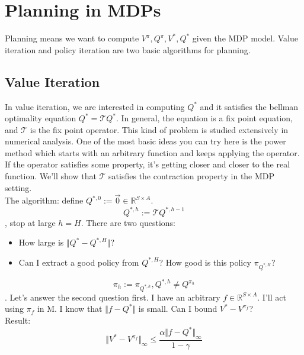 \documentclass{report}
\begin{document}
\section{Planning in MDPs}
Planning means we want to compute $V^{\pi}, Q^{\pi}, V^{*}, Q^{*}$ given the MDP model. Value iteration and policy iteration are two basic algorithms for planning.
\subsection{Value Iteration}
In value iteration, we are interested in computing $Q^*$ and it satisfies the bellman optimality equation $Q^*=\mathcal{T}Q^*$. In general, the equation is a fix point equation, and $\mathcal{T}$ is the fix point operator. This kind of problem is studied extensively in numerical analysis. One of the most  basic ideas you can try here is the power method which starts with an arbitrary function and keeps applying the operator. If the operator satisfies some property, it's getting closer and closer to the real function. We'll show that $\mathcal{T}$ satisfies the contraction property in the MDP setting.\\
The algorithm: define $Q^{*,0}:=\Vec{0}\in \mathbb{R}^{S\times A}$. \[Q^{*,h}:=\mathcal{T}Q^{*,h-1}\], stop at large $h=H$. There are two questions:
\begin{itemize}
    \item How large is $\Vert Q^*-Q^{*, H}\Vert$?
    \item Can I extract a good policy from $Q^{*, H}$? How good is this policy $\pi_{Q^{*, H}}$?
\end{itemize}
\[\pi_h := \pi_{Q^{*,h}}, Q^{*,h} \neq Q^{\pi_h}\].
Let's answer the second question first. I have an arbitrary $f\in \mathbb{R}^{S\times A}$. I'll act using $\pi_f$ in M. I know that $\Vert f-Q^*\Vert$ is small. Can I bound $V^{*}-V^{\pi_f}$?\\
Result: \[\Vert  V^*-V^{ \pi_f} \Vert_{\infty} \leq \frac{\alpha \Vert f-Q^{*}\Vert_{\infty}}{1-\gamma}\]\cite{Singh1994AnFunctions}
\end{document}
